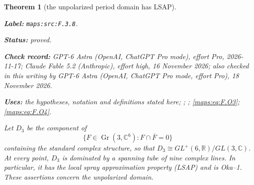 \documentclass[11pt,a4paper]{article}
\newtheorem{theorem}{Theorem}[section]
\theoremstyle{definition}
\newcommand{\StatementRecord}[4]{\par\smallskip\begingroup\upshape\raggedright\noindent\textbf{Label:} \nolinkurl{#1}.\par\noindent\textbf{Status:} #2.\par\noindent\textbf{Check record:} #3.\par\noindent\textbf{Uses:} #4.\par\endgroup\smallskip}
\newcommand{\CurrentChecker}{GPT-6 Astra (OpenAI, ChatGPT Pro mode, effort Pro), 18 November 2026}
\begin{document}
\begin{theorem}[the unpolarized period domain has LSAP]\label{maps:src:F.3.8}
\StatementRecord{maps:src:F.3.8}{proved}{GPT-6 Astra (OpenAI, ChatGPT Pro mode), effort Pro, 2026-11-17; Claude Fable 5.2 (Anthropic), effort high, 16 November 2026; also checked in this writing by \CurrentChecker}{the hypotheses, notation and definitions stated here; \cite[Definition 2.1, p.~4]{IVVOkaOneV5}; \cite[Proposition 7.13 and preceding paragraph, pp.~23--24]{IVVOkaOneV5}; \cref{maps:eq:F.O3}; \cref{maps:eq:F.O4}}


Let $D_3$ be the component of
\[
 \{F\in\operatorname{Gr}(3,\mathbb C^6):F\cap\overline F=0\}
\]
containing the standard complex structure, so that
$D_3\cong GL^+(6,\mathbb R)/GL(3,\mathbb C)$.
At every point, $D_3$
is dominated by a spanning tube of nine complex lines.  In particular,
it has the local spray approximation property (LSAP) and is Oka--1.
These assertions concern the unpolarized domain.

\end{theorem}
\end{document}
